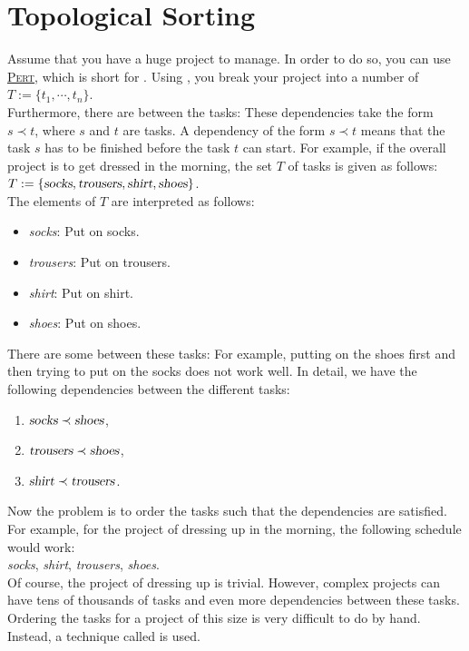 \section{Topological Sorting}
Assume that you have a huge project to manage.  In order to do so, you can use 
\href{https://en.wikipedia.org/wiki/Program_evaluation_and_review_technique}{\textsc{Pert}}, which is short for
.  Using ,
you break your project into a number of 
\\[0.2cm]
\hspace*{1.3cm}
$T := \{t_1,\cdots,t_n\}$.  
\\[0.2cm]
Furthermore, there are  between the tasks: These dependencies take the form $s \prec t$, where $s$ and
$t$ are tasks.  A dependency of the form $s \prec t$ means that the task $s$ has to be finished before the task $t$
can start.  For example, if the overall project is to get dressed in the morning, the set $T$ of tasks is given
as follows:
\\[0.2cm]
\hspace*{1.3cm}
$T := \{ \textsl{socks}, \textsl{trousers}, \textsl{shirt}, \textsl{shoes} \}$.
\\[0.2cm]
The elements of $T$ are interpreted as follows:
\begin{itemize}
\item \textsl{socks}: Put on socks.
\item \textsl{trousers}: Put on trousers.
\item \textsl{shirt}: Put on shirt.
\item \textsl{shoes}: Put on shoes.
\end{itemize}
There are some  between these tasks:  For example, putting on the shoes first and then trying to
put on the socks does not work well.  In detail, we have the following dependencies between the different tasks:
\begin{enumerate}
\item $\textsl{socks} \prec \textsl{shoes}$,
\item $\textsl{trousers} \prec \textsl{shoes}$,
\item $\textsl{shirt} \prec \textsl{trousers}$.
\end{enumerate}
Now the problem is to order the tasks such that the dependencies are satisfied.  For example, for the project
of dressing up in the morning, the following schedule would work:
\\[0.2cm]
\hspace*{1.3cm}
\textsl{socks}, \textsl{shirt}, \textsl{trousers}, \textsl{shoes}.
\\[0.2cm]
Of course, the project of dressing up is trivial.
However, complex projects can have tens of thousands of tasks and even more dependencies between these tasks.
Ordering the tasks for a project of this size is very difficult to do by hand.  Instead, a technique called  is used. 

